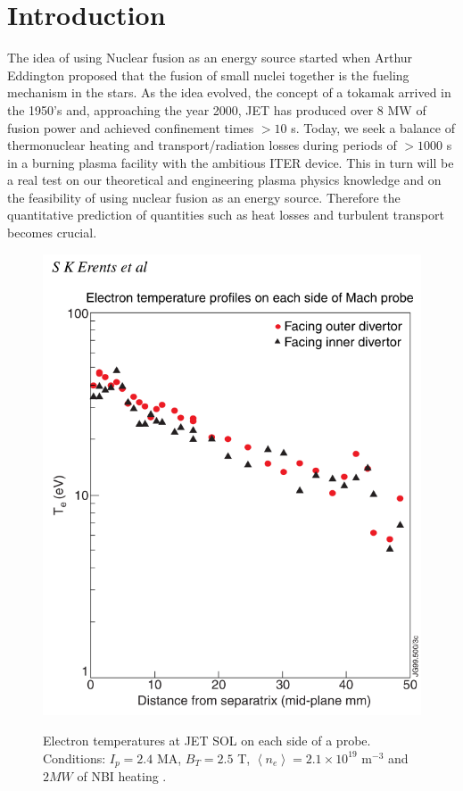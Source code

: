 



\maketitle
\thispagestyle{empty}
\newpage


\section{Introduction \label{intro}}

The idea of using Nuclear fusion as an energy source started when Arthur Eddington proposed that the fusion of small nuclei together is the fueling mechanism in the stars. As the idea evolved, the concept of a tokamak arrived in the 1950's and, approaching the year 2000, JET has produced over 8 MW of fusion power and achieved confinement times $> 10$ s.
Today, we seek a balance of thermonuclear heating and transport/radiation losses during periods of $> 1000$ s in a burning plasma facility with the ambitious ITER device. This in turn will be a real test on our theoretical and engineering plasma physics knowledge and on the feasibility of using nuclear fusion as an energy source. Therefore the quantitative prediction of quantities such as heat losses and turbulent transport becomes crucial.
\begin{figure}[h!]
\centering
\includegraphics[width=.4\textwidth]{images/jet_sol_parameters.png}
\label{jetsolparams}
\caption{Electron temperatures at JET SOL on each side of a probe. Conditions: $I_p = 2.4$ MA, $B_T = 2.5$ T, $\left< n_e \right> = 2.1 \times 10^{19}$ m$^{-3}$ and $2 MW$ of NBI heating \cite{Erents2002}.}
\end{figure}

